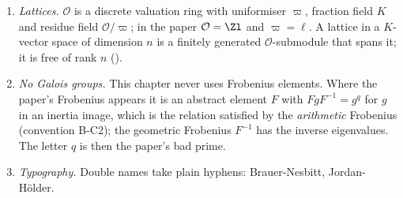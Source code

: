 \begin{convention}
\begin{enumerate}[label=(C\arabic*)]
$C_{ns}$, $N_{ns}$, $Q_8$, $C_4=\langle J\rangle$, $\mathrm B$, $\mathrm U=\langle u\rangle$ of $\GL_2(\F_3)$ are the standard models of . Thus
$J=m_{-i}$ is multiplication by $-i$ on $\F_9=\F_3\oplus\F_3i$, $a=m_{1+i}$, $a^2=J$, $w=\sigma J$, $N_s(\F_3)=\langle J,\sigma\rangle$, $N_{ns}(\F_3)=\langle a,\sigma\rangle$, and
$\psi\colon C_4\to\F_9^\times$ is the character $\psi(J)=i$.
\item \emph{Lattices.} $\mathcal{O}$ is a discrete valuation ring with uniformiser $\varpi$, fraction field $K$ and residue field $\mathcal{O}/\varpi$; in the paper
$\mathcal{O}=\Zl$ and $\varpi=\ell$. A lattice in a $K$-vector space of dimension $n$ is a finitely generated $\mathcal{O}$-submodule that spans it; it is free of
rank $n$ ().
\item \emph{No Galois groups.} This chapter never uses Frobenius elements. Where the paper's Frobenius appears it is an abstract element
$F$ with $FgF^{-1}=g^q$ for $g$ in an inertia image, which is the relation satisfied by the \emph{arithmetic} Frobenius (convention B-C2);
the geometric Frobenius $F^{-1}$ has the inverse eigenvalues. The letter $q$ is then the paper's bad prime.
\item \emph{Typography.} Double names take plain hyphens: Brauer-Nesbitt, Jordan-H\"older.
\end{enumerate}
\end{convention}

